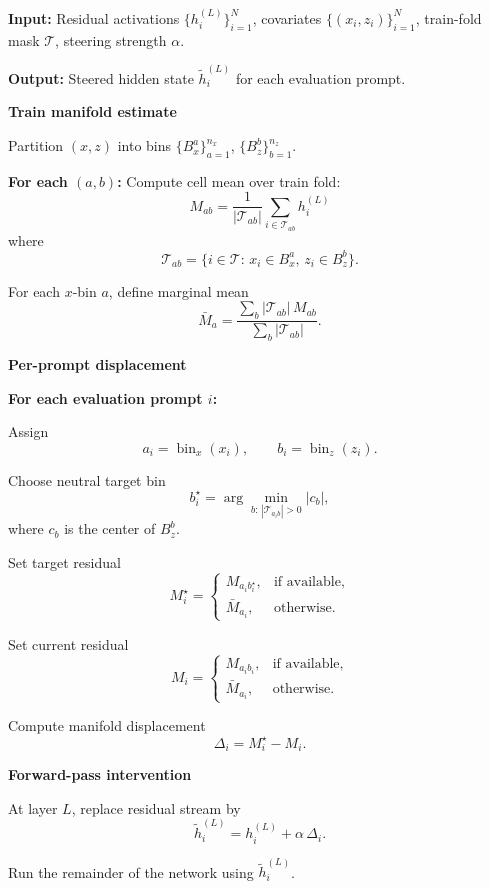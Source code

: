 \documentclass{article}
\begin{document}
\begin{algorithm}[t]
\caption{Dual (Manifold) Steering via Cell-Mean Residual Transport}
\label{alg:dual-steering}
\textbf{Input:}
Residual activations $\{h_i^{(L)}\}_{i=1}^N$, covariates $\{(x_i,z_i)\}_{i=1}^N$,
train-fold mask $\mathcal{T}$, steering strength $\alpha$.

\textbf{Output:}
Steered hidden state $\tilde h_i^{(L)}$ for each evaluation prompt.

\textbf{Train manifold estimate}

Partition $(x,z)$ into bins
$\{B_x^a\}_{a=1}^{n_x}$,
$\{B_z^b\}_{b=1}^{n_z}$.

\textbf{For each $(a,b)$:}
    Compute cell mean over train fold:
    \[
    M_{ab}
    =
    \frac{1}{|\mathcal T_{ab}|}
    \sum_{i\in\mathcal T_{ab}} h_i^{(L)}
    \]
    where
    \[
    \mathcal T_{ab}
    =
    \{i\in\mathcal T:\,
    x_i\in B_x^a,\,
    z_i\in B_z^b\}.
    \]

For each $x$-bin $a$, define marginal mean
\[
\bar M_a
=
\frac{\sum_b |\mathcal T_{ab}|\,M_{ab}}
{\sum_b |\mathcal T_{ab}|}.
\]

\vspace{1em}
\textbf{Per-prompt displacement}

\textbf{For each evaluation prompt $i$:}

Assign
\[
a_i=\operatorname{bin}_x(x_i),
\qquad
b_i=\operatorname{bin}_z(z_i).
\]

Choose neutral target bin
\[
b_i^\star
=
\arg\min_{b:\,|\mathcal T_{a_i b}|>0}
|c_b|,
\]
where $c_b$ is the center of $B_z^b$.

Set target residual
\[
M_i^\star=
\begin{cases}
M_{a_i b_i^\star}, & \text{if available},\\
\bar M_{a_i}, & \text{otherwise}.
\end{cases}
\]

Set current residual
\[
M_i=
\begin{cases}
M_{a_i b_i}, & \text{if available},\\
\bar M_{a_i}, & \text{otherwise}.
\end{cases}
\]

Compute manifold displacement
\[
\Delta_i=M_i^\star-M_i.
\]

\vspace{1em}
\textbf{Forward-pass intervention}

At layer $L$, replace residual stream by
\[
\tilde h_i^{(L)}
=
h_i^{(L)}+\alpha\,\Delta_i.
\]

Run the remainder of the network using $\tilde h_i^{(L)}$.
\end{algorithm}
\end{document}

